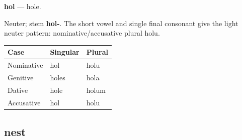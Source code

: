 \par\begin{minipage}{\linewidth}\raggedright
\textbf{hol} — hole.

Neuter; stem \textbf{hol-}. The short vowel and single final consonant give the light neuter pattern: nominative/\allowbreak{}accusative plural holu.

\par\begingroup
\fontsize{10.5}{13.2}\selectfont
\setlength{\LTleft}{0pt}\setlength{\LTright}{\fill}
\noindent
\begin{tabular}{@{}>{\raggedright\arraybackslash}p{39.46mm}>{\raggedright\arraybackslash}p{39.46mm}>{\raggedright\arraybackslash}p{39.46mm}@{}}
\toprule
\textbf{Case} & \textbf{Singular} & \textbf{Plural} \\
\midrule
Nominative & hol & holu \\
Genitive & holes & hola \\
Dative & hole & holum \\
Accusative & hol & holu \\
\bottomrule
\end{tabular}
\par\endgroup

\end{minipage}\par
{}
\subsection*{nest}

